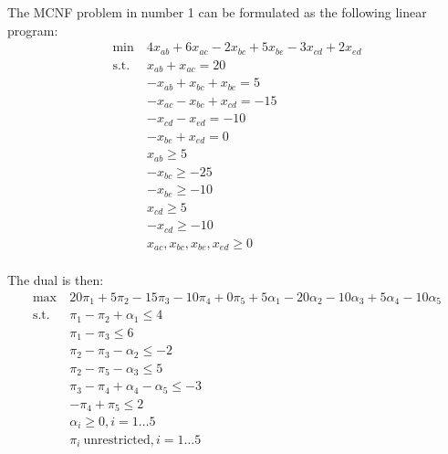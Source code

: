 \documentclass[12pt]{article}
\begin{document}
\begin{enumerate}
  The MCNF problem in number 1 can be formulated as the following linear program:\\
  \begin{equation}
    \begin{split}
      \text{min}\ &4x_{ab}+6x_{ac}-2x_{bc}+5x_{be}-3x_{cd}+2x_{ed}\\
      \text{s.t.}\ &x_{ab}+x_{ac}=20\\
      &-x_{ab}+x_{bc}+x_{be}=5\\
      &-x_{ac}-x_{bc}+x_{cd}=-15\\
      &-x_{cd}-x_{ed}=-10\\
      &-x_{be}+x_{ed}=0\\
      &x_{ab}\geq5\\
      &-x_{bc}\geq-25\\
      &-x_{be}\geq-10\\
      &x_{cd}\geq5\\
      &-x_{cd}\geq-10\\
      &x_{ac},x_{bc},x_{be},x_{ed}\geq0\\
    \end{split}
  \end{equation}

  The dual is then:\\
  \begin{equation}
    \begin{split}
      \text{max}\ &20\pi_1+5\pi_2-15\pi_3-10\pi_4+0\pi_5+5\alpha_1-20\alpha_2-10\alpha_3+5\alpha_4-10\alpha_5\\
      \text{s.t.}\ &\pi_1-\pi_2+\alpha_1\leq4\\
      &\pi_1-\pi_3\leq6\\
      &\pi_2-\pi_3-\alpha_2\leq-2\\
      &\pi_2-\pi_5-\alpha_3\leq5\\
      &\pi_3-\pi_4+\alpha_4-\alpha_5\leq-3\\
      &-\pi_4+\pi_5\leq2\\
      &\alpha_i\geq0,i=1\ldots5\\
      &\pi_i\ \text{unrestricted},i=1\ldots5\\
    \end{split}
  \end{equation}


\end{enumerate}
\end{document}
